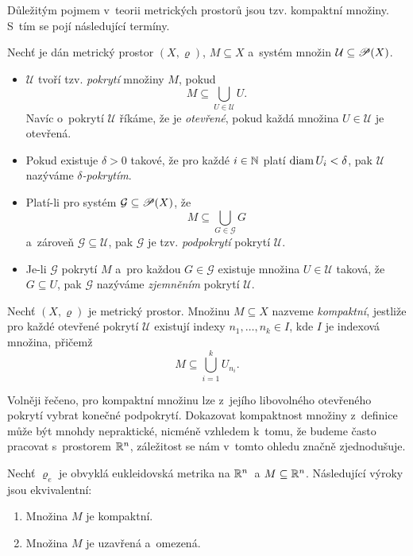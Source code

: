 Důležitým pojmem v~teorii metrických prostorů jsou tzv. kompaktní množiny. S~tím se pojí následující termíny.
\begin{definition}\label{def:delta-pokryti-zjemneni}
    Nechť je dán metrický prostor $(X,\varrho)$, $M\subseteq X$ a~systém množin $\mathcal{U}\subseteq\mathscr{P}(X)$.
    \begin{itemize}
        \item $\mathcal{U}$ tvoří tzv. \emph{pokrytí} množiny $M$, pokud
        \[M\subseteq\bigcup_{U\in\mathcal{U}} U.\]
        Navíc o~pokrytí $\mathcal{U}$ říkáme, že je \emph{otevřené}, pokud každá množina $U\in\mathcal{U}$ je otevřená.
        \item Pokud existuje $\delta>0$ takové, že pro každé $i\in\mathbb{N}$ platí $\operatorname{diam}{U_i}<\delta$, pak $\mathcal{U}$ nazýváme \emph{$\delta$-pokrytím}.
        \item Platí-li pro systém $\mathcal{G}\subseteq\mathscr{P}(X)$, že
        \[M\subseteq\bigcup_{G\in\mathcal{G}} G\]
        a~zároveň $\mathcal{G}\subseteq\mathcal{U}$, pak $\mathcal{G}$ je tzv. \emph{podpokrytí} pokrytí $\mathcal{U}$.
        \item Je-li $\mathcal{G}$ pokrytí $M$ a~pro každou $G\in\mathcal{G}$ existuje množina $U\in\mathcal{U}$ taková, že $G\subseteq U$, pak $\mathcal{G}$ nazýváme \emph{zjemněním} pokrytí $\mathcal{U}$. 
    \end{itemize}
\end{definition}
\begin{definition}\label{def:kompaktni-mnozina}
    Nechť $(X,\varrho)$ je metrický prostor. Množinu $M\subseteq X$ nazveme \emph{kompaktní}, jestliže pro každé otevřené pokrytí $\mathcal{U}$ existují indexy $n_1,\ldots,n_k\in I$, kde $I$ je indexová množina, přičemž
    \[M\subseteq\bigcup_{i=1}^k U_{n_i}.\]
\end{definition}
Volněji řečeno, pro kompaktní množinu lze z~jejího libovolného otevřeného pokrytí vybrat konečné podpokrytí. Dokazovat kompaktnost množiny z~definice může být mnohdy nepraktické, nicméně vzhledem k~tomu, že budeme často pracovat s~prostorem $\mathbb{R}^n$, záležitost se nám v~tomto ohledu značně zjednodušuje.
\begin{theorem}\label{thm:heine-borel}
    Nechť $\varrho_e$ je obvyklá eukleidovská metrika na $\mathbb{R}^n$~a $M\subseteq\mathbb{R}^n$. Následující výroky jsou ekvivalentní:
    \begin{enumerate}[label=(\roman*)]
        \item Množina $M$ je kompaktní.
        \item Množina $M$ je uzavřená a~omezená.
    \end{enumerate}
\end{theorem}
